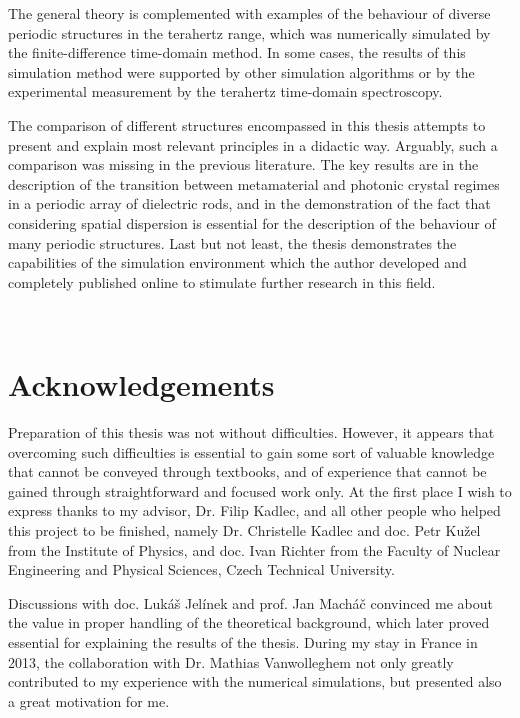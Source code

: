 The general theory is complemented with examples of the behaviour of diverse periodic structures in the terahertz range, which was numerically simulated by the finite-difference time-domain method. In some cases, the results of this simulation method were supported by other simulation algorithms or by the experimental measurement by the terahertz time-domain spectroscopy. 

The comparison of different structures encompassed in this thesis attempts to present and explain most relevant principles in a didactic way. Arguably, such a comparison was missing in the previous literature.
The key results are in the description of the transition between metamaterial and photonic crystal regimes in a periodic array of dielectric rods, and in the demonstration of the fact that considering spatial dispersion is essential for the description of the behaviour of many periodic structures.
Last but not least, the thesis demonstrates the capabilities of the simulation environment which the author developed and completely published online to stimulate further research in this field. 



\thispagestyle{empty} \newpage ~ \thispagestyle{empty} \newpage \setcounter{page}{1}

{\let\clearpage\relax\chapter*{Acknowledgements}}
Preparation of this thesis was not without difficulties. However, it appears that overcoming such difficulties is essential to gain some sort of valuable knowledge that cannot be conveyed through textbooks, and of experience that cannot be gained through straightforward and focused work only.  At the first place I wish to express thanks to my advisor, Dr. Filip Kadlec, and all other people who helped this project to be finished, namely Dr. Christelle Kadlec and doc. Petr Ku\v{z}el  from the Institute of Physics, and doc. Ivan Richter from the Faculty of Nuclear Engineering and Physical Sciences, Czech Technical University. 

Discussions with doc. Lukáš Jelínek and prof. Jan Macháč convinced me about the value in proper handling of the theoretical background, which later proved essential for explaining the results of the thesis. During my stay in France in 2013, the collaboration with Dr. Mathias Vanwolleghem not only greatly contributed to my experience with the numerical simulations, but presented also a great motivation for me. 

